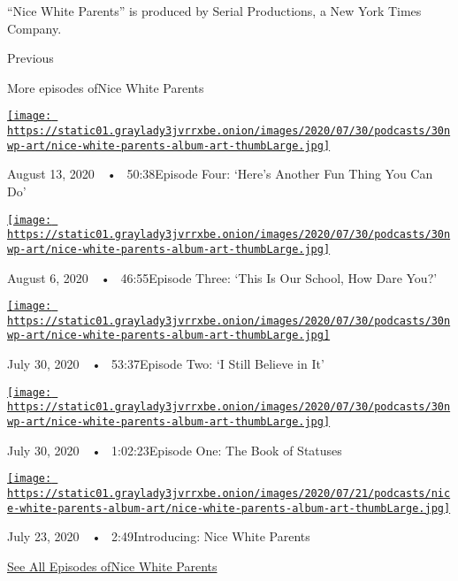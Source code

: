 ``Nice White Parents'' is produced by Serial Productions, a New York
Times Company.

Previous

More episodes ofNice White Parents

\href{https://www.nytimes3xbfgragh.onion/2020/08/13/podcasts/nice-white-parents-school.html?action=click\&module=audio-series-bar\&region=header\&pgtype=Article}{\texttt{[image: https://static01.graylady3jvrrxbe.onion/images/2020/07/30/podcasts/30nwp-art/nice-white-parents-album-art-thumbLarge.jpg]}}

August 13, 2020~~•~ 50:38Episode Four: `Here's Another Fun Thing You Can
Do'

\href{https://www.nytimes3xbfgragh.onion/2020/08/06/podcasts/episode-three-this-is-our-school-how-dare-you.html?action=click\&module=audio-series-bar\&region=header\&pgtype=Article}{\texttt{[image: https://static01.graylady3jvrrxbe.onion/images/2020/07/30/podcasts/30nwp-art/nice-white-parents-album-art-thumbLarge.jpg]}}

August 6, 2020~~•~ 46:55Episode Three: `This Is Our School, How Dare
You?'

\href{https://www.nytimes3xbfgragh.onion/2020/07/30/podcasts/nice-white-parents-serial-2.html?action=click\&module=audio-series-bar\&region=header\&pgtype=Article}{\texttt{[image: https://static01.graylady3jvrrxbe.onion/images/2020/07/30/podcasts/30nwp-art/nice-white-parents-album-art-thumbLarge.jpg]}}

July 30, 2020~~•~ 53:37Episode Two: `I Still Believe in It'

\href{https://www.nytimes3xbfgragh.onion/2020/07/30/podcasts/nice-white-parents-serial.html?action=click\&module=audio-series-bar\&region=header\&pgtype=Article}{\texttt{[image: https://static01.graylady3jvrrxbe.onion/images/2020/07/30/podcasts/30nwp-art/nice-white-parents-album-art-thumbLarge.jpg]}}

July 30, 2020~~•~ 1:02:23Episode One: The Book of Statuses

\href{https://www.nytimes3xbfgragh.onion/2020/07/23/podcasts/nice-white-parents-serial.html?action=click\&module=audio-series-bar\&region=header\&pgtype=Article}{\texttt{[image: https://static01.graylady3jvrrxbe.onion/images/2020/07/21/podcasts/nice-white-parents-album-art/nice-white-parents-album-art-thumbLarge.jpg]}}

July 23, 2020~~•~ 2:49Introducing: Nice White Parents

\href{https://www.nytimes3xbfgragh.onion/column/nice-white-parents}{See
All Episodes ofNice White Parents}


